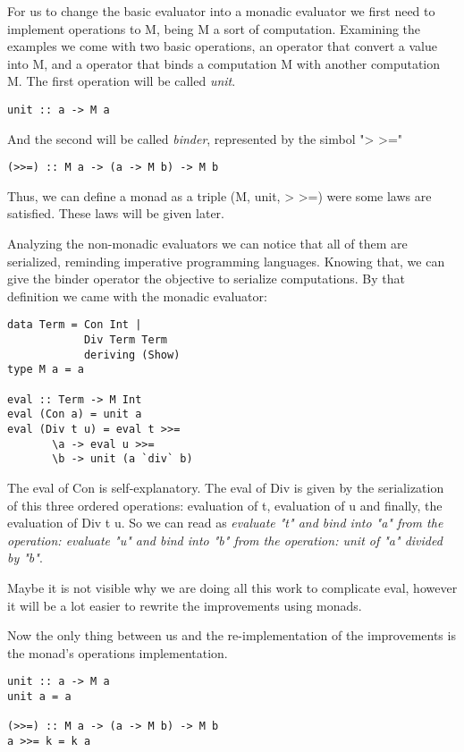 \documentclass[twocolumn,10pt]{article}
\begin{document}
For us to change the basic evaluator into a monadic evaluator we first need to implement operations to M, being M a sort of computation. Examining the examples we come with two basic operations, an operator that convert a value into M, and a operator that binds a computation M with another computation M. The first operation will be called \textit{unit}.

\lstset{language=Haskell}
\begin{lstlisting}
unit :: a -> M a
\end{lstlisting}

And the second will be called \textit{binder}, represented by the simbol "> >="

\lstset{language=Haskell}
\begin{lstlisting}
(>>=) :: M a -> (a -> M b) -> M b
\end{lstlisting}

Thus, we can define a monad as a triple (M, unit,  > >=) were some laws are satisfied. These laws will be given later.

Analyzing the non-monadic evaluators we can notice that all of them are serialized, reminding imperative programming languages. Knowing that, we can give the binder operator the objective to serialize computations. By that definition we came with the monadic evaluator:

\lstset{language=Haskell}
\begin{lstlisting}
data Term = Con Int | 
            Div Term Term 
            deriving (Show)
type M a = a

eval :: Term -> M Int
eval (Con a) = unit a
eval (Div t u) = eval t >>= 
	   \a -> eval u >>= 
	   \b -> unit (a `div` b)
\end{lstlisting}

The eval of Con is self-explanatory. The eval of Div is given by the serialization of this three ordered operations: evaluation of t, evaluation of u and finally, the evaluation of Div t u. So we can read as \textit{evaluate "t" and bind into "a" from the operation: evaluate "u" and bind into "b" from the operation: unit of "a" divided by "b"}.

Maybe it is not visible why we are doing all this work to complicate eval, however it will be a lot easier to rewrite the improvements using monads.

Now the only thing between us and the re-implementation of the improvements is the monad's operations implementation.

\lstset{language=Haskell}
\begin{lstlisting}
unit :: a -> M a
unit a = a

(>>=) :: M a -> (a -> M b) -> M b
a >>= k = k a
\end{lstlisting}
\end{document}
